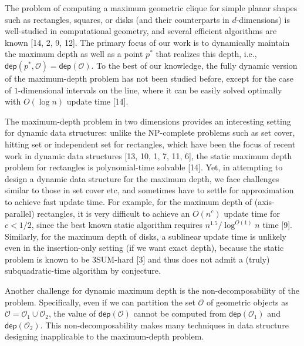 \documentclass[10pt,a4paper]{article}
\begin{document}
\par
\par
The problem of computing a maximum geometric clique for simple planar shapes such as rectangles, squares, or disks (and their counterparts in $d$-dimensions) is well-studied in computational geometry, and several efficient algorithms are known [14, 2, 9, 12]. The primary focus of our work is to dynamically maintain the maximum depth as well as a point $p^{*}$ that realizes this depth, i.e., $\mathsf{dep}(p^{*},\mathcal{O})=\mathsf{dep}(\mathcal{O})$. To the best of our knowledge, the fully dynamic version of the maximum-depth problem has not been studied before, except for the case of $1$-dimensional intervals on the line, where it can be easily solved optimally with $O(\log n)$ update time [14].
\par
\par
The maximum-depth problem in two dimensions provides an interesting setting for dynamic data structures: unlike the NP-complete problems such as set cover, hitting set or independent set for rectangles, which have been the focus of recent work in dynamic data structures [13, 10, 1, 7, 11, 6], the static maximum depth problem for rectangles is polynomial-time solvable [14]. Yet, in attempting to design a dynamic data structure for the maximum depth, we face challenges similar to those in set cover etc, and sometimes have to settle for approximation to achieve fast update time. For example, for the maximum depth of (axis-parallel) rectangles, it is very difficult to achieve an $O(n^{c})$ update time for $c<1/2$, since the best known static algorithm requires $n^{1.5}/\log^{O(1)}n$ time [9]. Similarly, for the maximum depth of disks, a sublinear update time is unlikely even in the insertion-only setting (if we want exact depth), because the static problem is known to be 3SUM-hard [3] and thus does not admit a (truly) subquadratic-time algorithm by conjecture.
\par
\par
Another challenge for dynamic maximum depth is the non-decomposability of the problem. Specifically, even if we can partition the set $\mathcal{O}$ of geometric objects as $\mathcal{O}=\mathcal{O}_{1}\cup\mathcal{O}_{2}$, the value of $\mathsf{dep}(\mathcal{O})$ cannot be computed from $\mathsf{dep}(\mathcal{O}_{1})$ and $\mathsf{dep}(\mathcal{O}_{2})$. This non-decomposability makes many techniques in data structure designing inapplicable to the maximum-depth problem.
\end{document}

